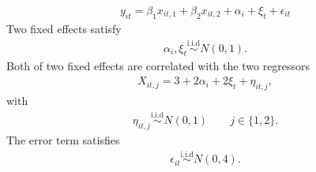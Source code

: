 \documentclass[a4paper,11pt,english]{sphinxmanual}
\begin{document}
\begin{fulllineitems}
\begin{description}
\end{description}
\begin{equation*}
\begin{split}y_{it} = \beta_{1}x_{it,1}+\beta_{2}x_{it,2}+\alpha_{i}+\xi_{t}+\epsilon_{it}\end{split}
\end{equation*}
\sphinxAtStartPar
Two fixed effects satisfy
\begin{equation*}
\begin{split}\alpha_{i}, \xi_{t}\stackrel{\text{i.i.d}}{\sim}N(0,1).\end{split}
\end{equation*}
\sphinxAtStartPar
Both of two fixed effects are correlated with the two regressors
\begin{equation*}
\begin{split}X_{it,j}=3+2\alpha_i+2\xi_t+\eta_{it,j},\end{split}
\end{equation*}
\sphinxAtStartPar
with
\begin{equation*}
\begin{split}\eta_{it,j}\stackrel{\text{i.i.d}}{\sim} N(0,1) \qquad j\in \{1,2\}.\end{split}
\end{equation*}
\sphinxAtStartPar
The error term satisfies
\begin{equation*}
\begin{split}\epsilon_{it} \stackrel{\text{i.i.d}}{\sim}N(0,4).\end{split}
\end{equation*}
\end{fulllineitems}

\end{document}
